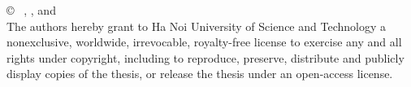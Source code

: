 \thispagestyle{empty}
\begin{center}
\vspace*{\fill}
{\copyright~ \textit{\firstAuthor}, \textit{\secondAuthor}, and \textit{\thirdAuthor}}\\
The authors hereby grant to Ha Noi University of Science and Technology a nonexclusive, worldwide, irrevocable, royalty-free
license to exercise any and all rights under copyright, including to reproduce, preserve,
distribute and publicly display copies of the thesis, or release the thesis under an
open-access license.



\vspace*{\fill} 
\end{center}